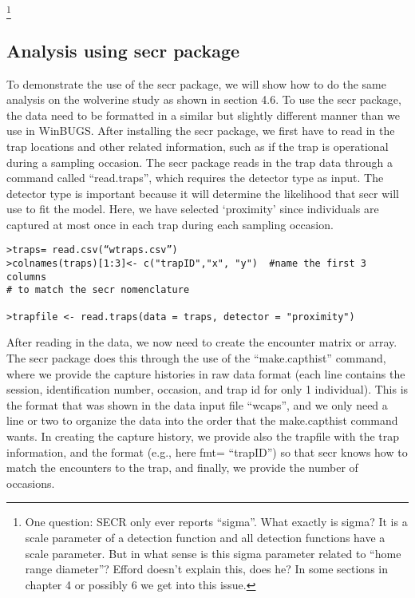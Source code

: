 \footnote{One question: SECR only ever reports “sigma”. What exactly is sigma?  It is a scale parameter of a detection function and all detection functions have a scale parameter. But in what sense is this sigma parameter related to “home range diameter”?  Efford doesn’t explain this, does he?  In some sections in chapter 4 or possibly 6 we get into this issue. 
}

\subsection{ Analysis using secr package}

To demonstrate the use of the secr package, we will show how to do the
same analysis on the wolverine study as shown in section 4.6.  To use
the secr package, the data need to be formatted in a similar but
slightly different manner than we use in WinBUGS.  After installing
the secr package, we first have to read in the trap locations and
other related information, such as if the trap is operational during a
sampling occasion.  The secr package reads in the trap data through a
command called “read.traps”, which requires the detector type as
input.  The detector type is important because it will determine the
likelihood that secr will use to fit the model.  Here, we have
selected ‘proximity’ since individuals are captured at most once in
each trap during each sampling occasion.

\begin{verbatim}
>traps= read.csv(“wtraps.csv”)
>colnames(traps)[1:3]<- c("trapID","x", "y")  #name the first 3 columns 
# to match the secr nomenclature

>trapfile <- read.traps(data = traps, detector = "proximity")
\end{verbatim}

After reading in the data, we now need to create the encounter matrix
or array.  The secr package does this through the use of the
“make.capthist” command, where we provide the capture histories in raw
data format (each line contains the session, identification number,
occasion, and trap id for only 1 individual).  This is the format that
was shown in the data input file “wcaps”, and we only need a line or
two to organize the data into the order that the make.capthist command
wants.  In creating the capture history, we provide also the trapfile
with the trap information, and the format (e.g., here fmt= “trapID”)
so that secr knows how to match the encounters to the trap, and
finally, we provide the number of occasions.

